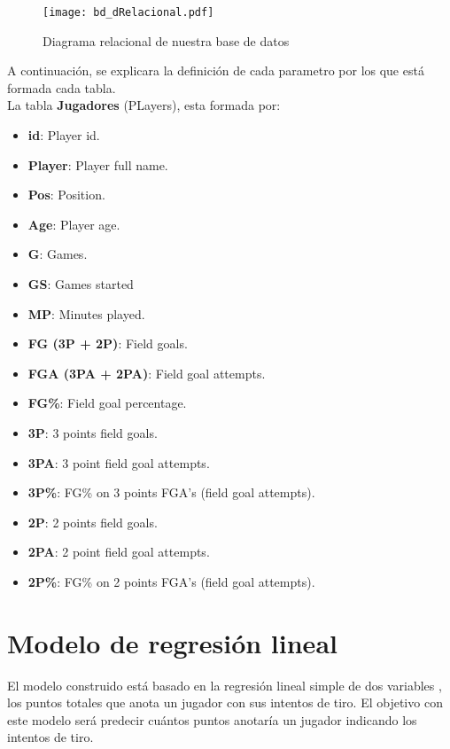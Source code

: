 \documentclass[11pt]{diazessay} %
\begin{document}
\begin{figure}[h!]
	\centering
	\texttt{[image: bd\_dRelacional.pdf]}
	\caption{Diagrama relacional de nuestra base de datos}
	\label{fig:diagrama}
\end{figure}

A continuación, se explicara la definición de cada parametro por los que está formada cada tabla.\\

La tabla \textbf{Jugadores} (PLayers), esta formada por:
\begin{itemize}
	\item \textbf{id}: Player id.
	\item \textbf{Player}: Player full name.
	\item \textbf{Pos}: Position.
	\item \textbf{Age}: Player age.
	\item \textbf{G}: Games.
	\item \textbf{GS}: Games started
	\item \textbf{MP}: Minutes played.
	\item \textbf{FG (3P + 2P)}: Field goals.
	\item \textbf{FGA (3PA + 2PA)}: Field goal attempts.
	\item \textbf{FG\%}: Field goal percentage.
	\item \textbf{3P}: 3 points field goals.
	\item \textbf{3PA}: 3 point field goal attempts.
	\item \textbf{3P\%}: FG\% on 3 points FGA's (field goal attempts).
	\item \textbf{2P}: 2 points field goals.	
	\item \textbf{2PA}: 2 point field goal attempts.
	\item \textbf{2P\%}: FG\% on 2 points FGA's (field goal attempts).
	
\end{itemize}

\section*{Modelo de regresión lineal}
El modelo construido está basado en la regresión lineal simple de dos variables \cite{regresion}, los puntos totales que anota un jugador con sus intentos de tiro. El objetivo con este modelo será predecir cuántos puntos anotaría un jugador indicando los intentos de tiro.\\
\end{document}

